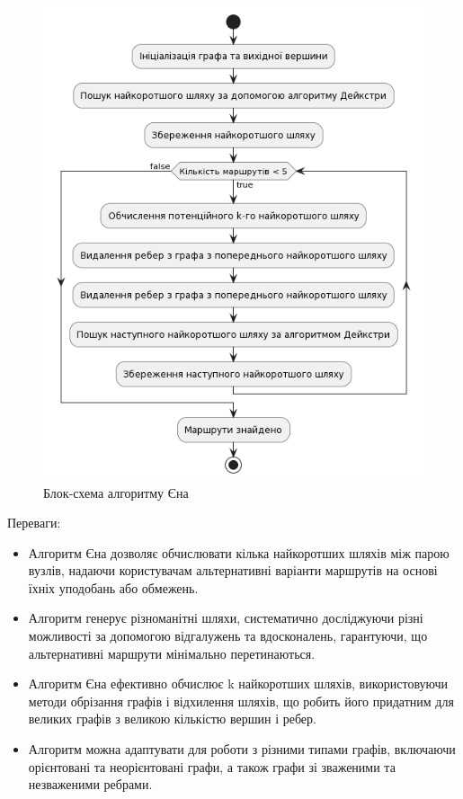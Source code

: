 \begin{figure}[!htp]
    \centering
    \includegraphics[scale=0.6]{content/chapters/2-implementation-methods/assets/img/yens_algorithm.png}
    \caption{Блок-схема алгоритму Єна}
    \label{fig:bfs}
\end{figure}


Переваги:
\begin{itemize}
    \item Алгоритм Єна дозволяє обчислювати кілька найкоротших шляхів між парою вузлів, надаючи користувачам альтернативні варіанти маршрутів на основі їхніх уподобань або обмежень.
    \item Алгоритм генерує різноманітні шляхи, систематично досліджуючи різні можливості за допомогою відгалужень та вдосконалень, гарантуючи, що альтернативні маршрути мінімально перетинаються.
    \item Алгоритм Єна ефективно обчислює k найкоротших шляхів, використовуючи методи обрізання графів і відхилення шляхів, що робить його придатним для великих графів з великою кількістю вершин і ребер.
    \item Алгоритм можна адаптувати для роботи з різними типами графів, включаючи орієнтовані та неорієнтовані графи, а також графи зі зваженими та незваженими ребрами.
\end{itemize}

